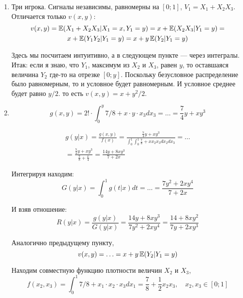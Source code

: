 \begin{enumerate}
\begin{enumerate}
\item Три игрока. Сигналы независимы, равномерны на $ [0;1] $, $ V_{1}=X_{1}+X_{2}X_{3} $.
Отличается только $ v(x,y) $:
\begin{multline}
v(x,y)=\operatorname{\mathbb{E}}(X_{1}+X_{2}X_{3}|X_{1}=x,Y_{1}=y)=x+\operatorname{\mathbb{E}}(X_{2}X_{3}|Y_{1}=y)=\\
x+\operatorname{\mathbb{E}}(Y_{1}Y_{2}|Y_{1}=y)=x+y\operatorname{\mathbb{E}}(Y_{2}|Y_{1}=y)
\end{multline}

Здесь мы посчитаем интуитивно, а в следующем пункте — через интегралы. Итак: если я знаю, что $ Y_{1} $, максимум из $ X_{2} $ и $ X_{3} $, равен $ y $, то оставшаяся величина $ Y_{2} $ где-то на отрезке $[0;y] $. Поскольку безусловное распределение было равномерным, то и условное будет равномерным. И условное среднее будет равно $ y/2 $. то есть $ v(x,y)=x+y^{2}/2 $.


\item

\begin{equation}
g(x,y)=2!\cdot \int_{0}^{y} 7/8+x\cdot y\cdot x_{3} dx_{3}=\ldots=\frac{7}{4}y+xy^{3}
\end{equation}

\begin{multline}
g(y|x)=\frac{g(x,y)}{f(x)}=\frac{\frac{7}{4}y+xy^{3}}{\int_{0}^{1}\int_{0}^{1} \frac{7}{8}+xx_{2}x_{3}dx_{2}dx_{3}}=\ldots\\
=\frac{\frac{7}{4}y+xy^{3}}{\frac{7}{8}+\frac{x}{4}}=\frac{14y+8xy^{3}}{7+2x}
\end{multline}

Интегрируя находим:
\begin{equation}
G(y|x)=\int_{0}^{1} g(t|x) dt=\ldots=\frac{7y^{2}+2xy^{4}}{7+2x}
\end{equation}

И взяв отношение:
\begin{equation}
R(y|x)=\frac{g(y|x)}{G(y|x)}=\frac{14y+8xy^{3}}{7y^{2}+2xy^{4}}=\frac{14+8xy^{2}}{7y+2xy^{3}}
\end{equation}

Аналогично предыдущему пункту,
\begin{equation}
v(x,y)=\ldots=x+y\operatorname{\mathbb{E}}(Y_{2}|Y_{1}=y)
\end{equation}



Находим совместную функцию плотности величин $ X_{2} $ и $ X_{3} $,
\begin{equation}
f(x_{2},x_{3})=\int_{0}^{1} 7/8+x_{1}\cdot x_{2}\cdot x_{3} dx_{1}=\frac{7}{8}+\frac{1}{2}x_{2}x_{3}, \quad x_{2},x_{3}\in [0;1]
\end{equation}


\end{enumerate}
\end{enumerate}
